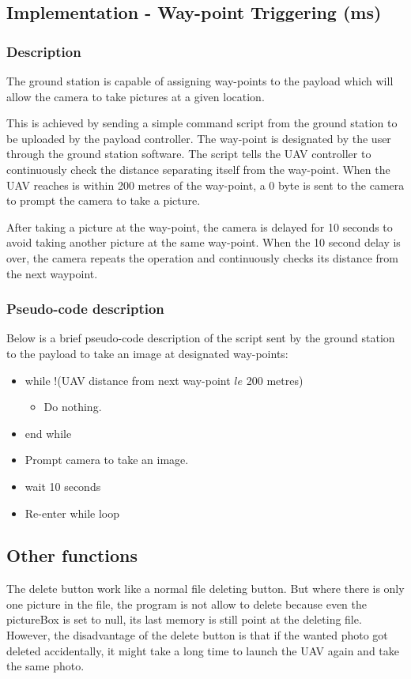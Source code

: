 \subsection{Implementation - Way-point Triggering (ms)}
\label{sec:waypoint_triggering}

\subsubsection{Description}

The ground station is capable of assigning way-points to
the payload which will allow the camera to take pictures 
at a given location.

This is achieved by sending a simple command script from
the ground station to be uploaded by the payload 
controller. The way-point is designated by the user
through the ground station software. The script 
tells the UAV controller to continuously check the
distance separating itself from the way-point.
When the UAV reaches is within 200 metres of the
way-point, a 0 byte is sent to the camera to prompt
the camera to take a picture.

After taking a picture at the way-point, the camera
is delayed for 10 seconds to avoid taking another picture
at the same way-point. When the 10 second delay is over,
the camera repeats the operation and continuously checks
its distance from the next waypoint.

\subsubsection{Pseudo-code description}

Below is a brief pseudo-code description of the script
sent by the ground station to the payload to take an
image at designated way-points:

\begin{itemize}
	\item while !(UAV distance from next way-point $le$ 200 metres)
		\begin{itemize}
			\item Do nothing.
		\end{itemize}
	\item end while
	\item Prompt camera to take an image.
	\item wait 10 seconds
	\item Re-enter while loop
\end{itemize}

\subsection{Other functions}
The delete button work like a normal file deleting button. But where there is only one picture in the file, the program is not allow to delete because even the pictureBox is set to null, its last memory is still point at the deleting file. However, the disadvantage of the delete button is that if the wanted photo got deleted accidentally, it might take a long time to launch the UAV again and take the same photo. 

